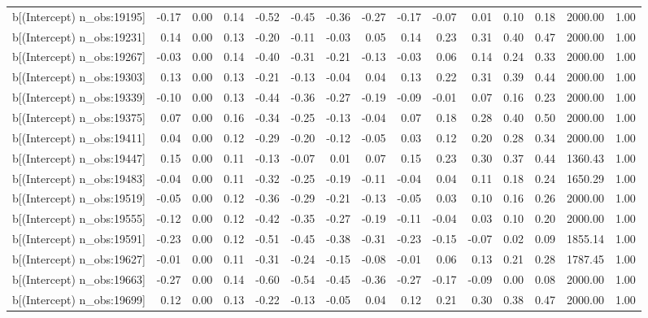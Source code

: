 \begin{table}[ht]
\begin{tabular}{rrrrrrrrrrrrrrr}
  b[(Intercept) n\_obs:19195] & -0.17 & 0.00 & 0.14 & -0.52 & -0.45 & -0.36 & -0.27 & -0.17 & -0.07 & 0.01 & 0.10 & 0.18 & 2000.00 & 1.00 \\ 
  b[(Intercept) n\_obs:19231] & 0.14 & 0.00 & 0.13 & -0.20 & -0.11 & -0.03 & 0.05 & 0.14 & 0.23 & 0.31 & 0.40 & 0.47 & 2000.00 & 1.00 \\ 
  b[(Intercept) n\_obs:19267] & -0.03 & 0.00 & 0.14 & -0.40 & -0.31 & -0.21 & -0.13 & -0.03 & 0.06 & 0.14 & 0.24 & 0.33 & 2000.00 & 1.00 \\ 
  b[(Intercept) n\_obs:19303] & 0.13 & 0.00 & 0.13 & -0.21 & -0.13 & -0.04 & 0.04 & 0.13 & 0.22 & 0.31 & 0.39 & 0.44 & 2000.00 & 1.00 \\ 
  b[(Intercept) n\_obs:19339] & -0.10 & 0.00 & 0.13 & -0.44 & -0.36 & -0.27 & -0.19 & -0.09 & -0.01 & 0.07 & 0.16 & 0.23 & 2000.00 & 1.00 \\ 
  b[(Intercept) n\_obs:19375] & 0.07 & 0.00 & 0.16 & -0.34 & -0.25 & -0.13 & -0.04 & 0.07 & 0.18 & 0.28 & 0.40 & 0.50 & 2000.00 & 1.00 \\ 
  b[(Intercept) n\_obs:19411] & 0.04 & 0.00 & 0.12 & -0.29 & -0.20 & -0.12 & -0.05 & 0.03 & 0.12 & 0.20 & 0.28 & 0.34 & 2000.00 & 1.00 \\ 
  b[(Intercept) n\_obs:19447] & 0.15 & 0.00 & 0.11 & -0.13 & -0.07 & 0.01 & 0.07 & 0.15 & 0.23 & 0.30 & 0.37 & 0.44 & 1360.43 & 1.00 \\ 
  b[(Intercept) n\_obs:19483] & -0.04 & 0.00 & 0.11 & -0.32 & -0.25 & -0.19 & -0.11 & -0.04 & 0.04 & 0.11 & 0.18 & 0.24 & 1650.29 & 1.00 \\ 
  b[(Intercept) n\_obs:19519] & -0.05 & 0.00 & 0.12 & -0.36 & -0.29 & -0.21 & -0.13 & -0.05 & 0.03 & 0.10 & 0.16 & 0.26 & 2000.00 & 1.00 \\ 
  b[(Intercept) n\_obs:19555] & -0.12 & 0.00 & 0.12 & -0.42 & -0.35 & -0.27 & -0.19 & -0.11 & -0.04 & 0.03 & 0.10 & 0.20 & 2000.00 & 1.00 \\ 
  b[(Intercept) n\_obs:19591] & -0.23 & 0.00 & 0.12 & -0.51 & -0.45 & -0.38 & -0.31 & -0.23 & -0.15 & -0.07 & 0.02 & 0.09 & 1855.14 & 1.00 \\ 
  b[(Intercept) n\_obs:19627] & -0.01 & 0.00 & 0.11 & -0.31 & -0.24 & -0.15 & -0.08 & -0.01 & 0.06 & 0.13 & 0.21 & 0.28 & 1787.45 & 1.00 \\ 
  b[(Intercept) n\_obs:19663] & -0.27 & 0.00 & 0.14 & -0.60 & -0.54 & -0.45 & -0.36 & -0.27 & -0.17 & -0.09 & 0.00 & 0.08 & 2000.00 & 1.00 \\ 
  b[(Intercept) n\_obs:19699] & 0.12 & 0.00 & 0.13 & -0.22 & -0.13 & -0.05 & 0.04 & 0.12 & 0.21 & 0.30 & 0.38 & 0.47 & 2000.00 & 1.00 \\ 

\end{tabular}
\end{table}
